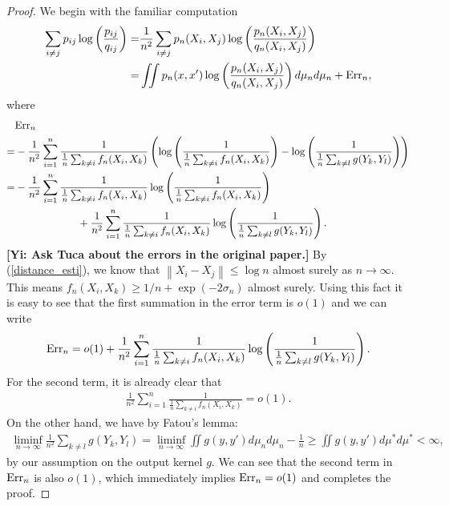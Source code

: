 \documentclass[10pt]{article}
\newcommand{\norm}[1]{\left\lVert#1\right\rVert}
\newcommand{\gy}[1]{\textbf{\color{red}[Yi: #1]}}
\newenvironment{Proof of lemma}{\noindent{\bf Proof of Lemma}}{\hfill$\Box$\newline}
\newenvironment{Proof of claim}{\noindent{\bf Proof of claim}}{\hfill$\Box$\newline}
\newenvironment{Proof of theorem}{\noindent{\bf Proof of Theorem}}{\hfill\scriptsize{$\Box$}\newline}
\newenvironment{Proof of theorems}{\noindent{\bf Proof of Theorems}}{\hfill$\Box$\newline}
\newenvironment{Proof of proposition}{\noindent{\bf Proof of Proposition}}{\hfill$\Box$\newline}
\newenvironment{Proof of propositions}{\noindent{\bf Proof of Propositions}}{\hfill$\Box$\newline}
\newenvironment{Proof of exercise}{\noindent{\it Proof of Exercise:}}{\hfill$\Box$}
\numberwithin{equation}{section}
\begin{document}
\begin{proof}
    We begin with the familiar computation
    \begin{align}
        \sum_{i \neq j} p_{ij} \log \left(\frac{p_{ij}}{q_{ij}}\right) = & \frac{1}{n^2}\sum_{i \neq j}p_n(X_i,X_j) \log \left(\frac{p_n(X_i,X_j)}{q_n(X_i,X_j)}\right) \nonumber          \\
        =                                                                & \iint p_n(x,x') \log \left(\frac{p_n(X_i,X_j)}{q_n(X_i,X_j)}\right) d \mu_n d \mu_n + \text{\normalfont Err}_n,
    \end{align}
    where
    \begin{align}
          & \text{\normalfont Err}_n \nonumber                                                                                                                                                                                                   \\
        = & -\frac{1}{n^2}\sum_{i=1}^n\frac{1}{\frac{1}{n}\sum_{k \neq i}f_n(X_i,X_k)}\left(\log \left(\frac{1}{\frac{1}{n}\sum_{k \neq i}f_n(X_i,X_k)}\right)-\log \left(\frac{1}{\frac{1}{n}\sum_{k \neq l}g(Y_k,Y_l)}\right)\right) \nonumber \\
        = & -\frac{1}{n^2}\sum_{i=1}^n\frac{1}{\frac{1}{n}\sum_{k \neq i}f_n(X_i,X_k)}\log \left(\frac{1}{\frac{1}{n}\sum_{k \neq i}f_n(X_i,X_k)}\right) \nonumber                                                                               \\
          & \qquad \qquad \qquad + \frac{1}{n^2}\sum_{i=1}^n\frac{1}{\frac{1}{n}\sum_{k \neq i}f_n(X_i,X_k)}\log \left(\frac{1}{\frac{1}{n}\sum_{k \neq l}g(Y_k,Y_l)}\right).
    \end{align}
    \gy{Ask Tuca about the errors in the original paper.} By (\ref{distance_esti}), we know that $\norm{X_i - X_j} \leq \log n$ almost surely as $n \to \infty$. This means $f_n(X_i,X_k) \geq 1/n + \exp(-2\sigma_n)$ almost surely. Using this fact it is easy to see that the first summation in the error term is $o(1)$ and we can write
    \begin{align}
        \text{\normalfont Err}_n = o(1) + \frac{1}{n^2}\sum_{i=1}^n\frac{1}{\frac{1}{n}\sum_{k \neq i}f_n(X_i,X_k)}\log \left(\frac{1}{\frac{1}{n}\sum_{k \neq l}g(Y_k,Y_l)}\right).
    \end{align}
    For the second term, it is already clear that
    \begin{align}
        \frac{1}{n^2}\sum_{i=1}^n\frac{1}{\frac{1}{n}\sum_{k \neq i}f_n(X_i,X_k)} = o(1).
    \end{align}
    On the other hand, we have by Fatou's lemma:
    \begin{align}
        \liminf_{n \to \infty}\frac{1}{n^2} \sum_{k \neq l}g(Y_k,Y_l) = \liminf_{n \to \infty} \iint g(y,y') d\mu_n d\mu_n - \frac{1}{n} \geq \iint g(y,y') d\mu^* d\mu^* < \infty,
    \end{align}
    by our assumption on the output kernel $g$. We can see that the second term in $\text{\normalfont Err}_n$ is also $o(1)$, which immediately implies $\text{\normalfont Err}_n = o(1)$ and completes the proof.
\end{proof}
\end{document}
